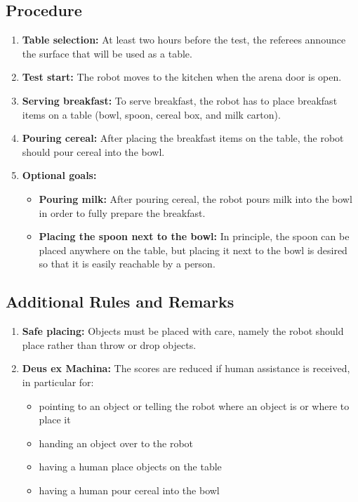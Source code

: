 \subsection*{Procedure}
\begin{enumerate}[nosep]
	\item \textbf{Table selection:} At least two hours before the test, the referees announce the surface that will be used as a table.
	\item \textbf{Test start:} The robot moves to the kitchen when the arena door is open.
	\item \textbf{Serving breakfast:} To serve breakfast, the robot has to place breakfast items on a table (bowl, spoon, cereal box, and milk carton).
	\item \textbf{Pouring cereal:} After placing the breakfast items on the table, the robot should pour cereal into the bowl.
	\item \textbf{Optional goals:}
		\begin{itemize}
			\item \textbf{Pouring milk:} After pouring cereal, the robot pours milk into the bowl in order to fully prepare the breakfast.
			\item \textbf{Placing the spoon next to the bowl:} In principle, the spoon can be placed anywhere on the table, but placing it next to the bowl is desired so that it is easily reachable by a person.
		\end{itemize}
\end{enumerate}

\subsection*{Additional Rules and Remarks}
\begin{enumerate}[nosep]
	\item \textbf{Safe placing:} Objects must be placed with care, namely the robot should place rather than throw or drop objects.
	\item \textbf{Deus ex Machina:} The scores are reduced if human assistance is received, in particular for:
	\begin{itemize}[nosep]
		\item pointing to an object or telling the robot where an object is or where to place it
		\item handing an object over to the robot
		\item having a human place objects on the table
		\item having a human pour cereal into the bowl
	\end{itemize}
\end{enumerate}

